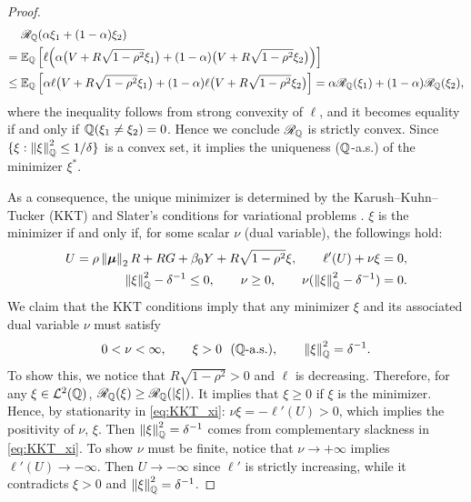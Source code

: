 \begin{proof}
    \begin{align*}
            & \mathscr{R}_{\mathbb{Q}}( \alpha \xi_1 + (1 - \alpha) \xi_2 )
            \\
            = {} & \mathbb{E}_{\mathbb{Q}} \left[  \ell \Bigl( \alpha \bigl(  V + R\sqrt{1 - \rho^2} \xi_1 \bigr) +  
            (1 - \alpha)\bigl( V + R\sqrt{1 - \rho^2} \xi_2 \bigr)
            \Bigr) \right] \\
            \le {} & \mathbb{E}_{\mathbb{Q}} \left[ \alpha \ell \bigl(  V + R\sqrt{1 - \rho^2} \xi_1 \bigr) +  
            (1 - \alpha) \ell\bigl( V + R\sqrt{1 - \rho^2} \xi_2 \bigr)
             \right] 
            = 
            \alpha \mathscr{R}_{\mathbb{Q}}( \xi_1 ) + (1 - \alpha) \mathscr{R}_{\mathbb{Q}}( \xi_2 ),
    \end{align*}
    where the inequality follows from strong convexity of $\ell$, and it becomes equality if and only if $\mathbb{Q}(\xi_1 \not= \xi_2) = 0$. Hence we conclude $\mathscr{R}_{\mathbb{Q}}$ is strictly convex. Since $\{ \xi: \left\|{\xi}\right\|_{\mathbb{Q}}^2 \le 1/\delta \}$ is a convex set, it implies the uniqueness ($\mathbb{Q}$-a.s.) of the minimizer $\xi^*$.

    As a consequence, the unique minimizer is determined by the Karush--Kuhn--Tucker (KKT) and Slater's conditions for variational problems \cite[Theorem 2.9.2]{zalinescu2002convex}. $\xi$ is the minimizer if and only if, for some scalar $\nu$ (dual variable), the followings hold:
    \begin{equation}\label{eq:KKT_xi}
        \begin{aligned}
            U = \rho\left\|{{\boldsymbol{\mu}}}\right\|_2 R + RG + \beta_0 Y + R\sqrt{1 - \rho^2} \xi,
            \qquad
            \ell' ( U ) + \nu \xi = 0, \\
            \left\|{\xi}\right\|_{\mathbb{Q}}^2 - \delta^{-1} \le 0,
            \qquad
            \nu \ge 0,
            \qquad
            \nu(\left\|{\xi}\right\|_{\mathbb{Q}}^2 - \delta^{-1}) = 0.
        \end{aligned}
    \end{equation}
    We claim that the KKT conditions imply that any minimizer $\xi$ and its associated dual variable $\nu$ must satisfy
    \begin{equation*}
        0 < \nu < \infty,  \qquad  \xi > 0 \ \  (\text{$\mathbb{Q}$-a.s.}), \qquad \left\|{\xi}\right\|_{\mathbb{Q}}^2 = \delta^{-1}.
    \end{equation*}
    To show this, we notice that $R\sqrt{1 - \rho^2} > 0$ and $\ell$ is decreasing. Therefore, for any $\xi \in \mathcal{L}^2(\mathbb{Q})$, $\mathscr{R}_{\mathbb{Q}}(\xi) \ge \mathscr{R}_{\mathbb{Q}}(\left|{\xi}\right|)$. It implies that $\xi \ge 0$ if $\xi$ is the minimizer. Hence, by stationarity in \cref{eq:KKT_xi}: $\nu\xi = - \ell' ( U ) > 0$, which implies the positivity of $\nu$, $\xi$. Then $\left\|{\xi}\right\|_{\mathbb{Q}}^2 = \delta^{-1}$ comes from complementary slackness in \cref{eq:KKT_xi}. To show $\nu$ must be finite, notice that $\nu \to +\infty$ implies $\ell'(U) \to -\infty$. Then $U \to -\infty$ since $\ell'$ is strictly increasing, while it contradicts $\xi > 0$ and $\left\|{\xi}\right\|_{\mathbb{Q}}^2 = \delta^{-1}$.


\end{proof}
